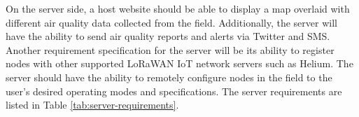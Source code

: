 On the server side, a host website should be able to display a map overlaid with different air quality data collected from the field. Additionally, the server will have the ability to send air quality reports and alerts via Twitter and SMS. Another requirement specification for the server will be its ability to register nodes with other supported LoRaWAN IoT network servers such as Helium. The server should have the ability to remotely configure nodes in the field to the user's desired operating modes and specifications. The server requirements are listed in Table \ref{tab:server-requirements}. 


